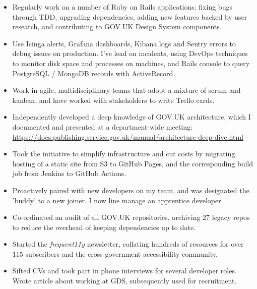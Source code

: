 \documentclass[10pt,a4paper,ragged2e,withhyper]{altacv}
\begin{document}
\begin{paracol}{2}


\begin{itemize}
    \item Regularly work on a number of Ruby on Rails applications: fixing bugs through TDD, upgrading dependencies, adding new features backed by user research, and contributing to GOV.UK Design System components.
    \item Use Icinga alerts, Grafana dashboards, Kibana logs and Sentry errors to debug issues on production. I've lead on incidents, using DevOps techniques to monitor disk space and processes on machines, and Rails console to query PostgreSQL / MongoDB records with ActiveRecord.
    \item Work in agile, multidisciplinary teams that adopt a mixture of scrum and kanban, and have worked with stakeholders to write Trello cards.
    \item Independently developed a deep knowledge of GOV.UK architecture, which I documented and presented at a department-wide meeting:
    \\
    \href{https://docs.publishing.service.gov.uk/manual/architecture-deep-dive.html}{https://docs.publishing.service.gov.uk/manual/architecture-deep-dive.html}
    \item Took the initiative to simplify infrastructure and cut costs by migrating hosting of a static site from S3 to GitHub Pages, and the corresponding build job from Jenkins to GitHub Actions.
    \item Proactively paired with new developers on my team, and was designated the 'buddy' to a new joiner. I now line manage an apprentice developer.
    \item Co-ordinated an audit of all GOV.UK repositories, archiving 27 legacy repos to reduce the overhead of keeping dependencies up to date.
    \item Started the \emph{frequent11y} newsletter, collating hundreds of resources for over 115 subscribers and the cross-government accessibility community.
    \item Sifted CVs and took part in phone interviews for several developer roles. Wrote article about working at GDS, subsequently used for recruitment.
\end{itemize}


\end{paracol}
\end{document}
